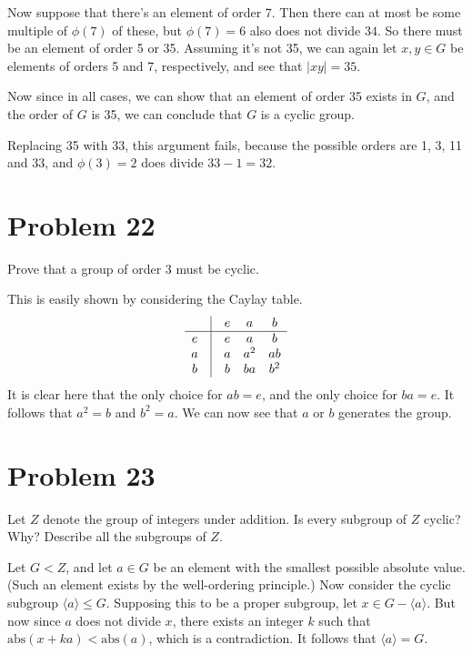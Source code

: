 \documentclass[12pt]{article}
\newcommand{\abs}{\mbox{abs}}
\begin{document}
Now suppose that there's an element of order 7.  Then there can at most be some multiple of
$\phi(7)$ of these, but $\phi(7)=6$ also does not divide $34$.  So there must be an
element of order 5 or 35.  Assuming it's not 35, we can again let $x,y\in G$ be elements
of orders 5 and 7, respectively, and see that $|xy|=35$.

Now since in all cases, we can show that an element of order 35 exists in $G$,
and the order of $G$ is 35, we can conclude that $G$ is a cyclic group.

Replacing 35 with 33, this argument fails, because the possible orders are 1, 3, 11 and 33,
and $\phi(3)=2$ does divide $33-1=32$.

\section*{Problem 22}

Prove that a group of order 3 must be cyclic.

This is easily shown by considering the Caylay table.
\begin{equation*}
\begin{array}{ccccc}
 & \vline & e & a & b \\
\hline
e & \vline & e & a & b \\
a & \vline & a & a^2 & ab \\
b & \vline & b & ba & b^2
\end{array}
\end{equation*}
It is clear here that the only choice for $ab=e$, and the only choice for $ba=e$.
It follows that $a^2=b$ and $b^2=a$.  We can now see that $a$ or $b$ generates the group.

\section*{Problem 23}

Let $Z$ denote the group of integers under addition.  Is every subgroup of $Z$ cyclic?
Why?  Describe all the subgroups of $Z$.

Let $G<Z$, and let $a\in G$ be an element with the smallest possible absolute value.
(Such an element exists by the well-ordering principle.)  Now consider the cyclic
subgroup $\langle a\rangle\leq G$.  Supposing this to be a proper subgroup,
let $x\in G-\langle a\rangle$.  But now since $a$ does not divide $x$, there
exists an integer $k$ such that $\abs(x+ka)<\abs(a)$, which is a contradiction.
It follows that $\langle a\rangle=G$.
\end{document}
